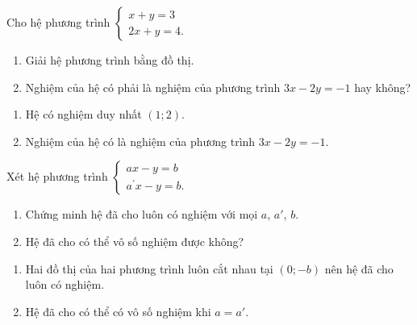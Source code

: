 \begin{bt}%
	Cho hệ phương trình $\begin{cases}
	{x + y = 3}\\
	{2x + y = 4.}
	\end{cases}$
	\begin{enumerate}
	\item Giải hệ phương trình bằng đồ thị.
	\item Nghiệm của hệ có phải là nghiệm của phương trình $3x - 2y = - 1$ hay không?
	\end{enumerate}
	\loigiai
	{
	\begin{enumerate}
	\item Hệ có nghiệm duy nhất $(1;2)$.
	\item Nghiệm của hệ có là nghiệm của phương trình $3x - 2y = - 1$.
	\end{enumerate}	
	}
\end{bt}
\begin{bt}%
	Xét hệ phương trình $\begin{cases}
	{a x - y = b}\\
	{a^{\prime}x - y = b.}
	\end{cases}$
	\begin{enumerate}
	\item Chứng minh hệ đã cho luôn có nghiệm với mọi $a$, $a'$, $b$.
	\item Hệ đã cho có thể vô số nghiệm được không?
	\end{enumerate}
	\loigiai
	{
	\begin{enumerate}
	\item Hai đồ thị của hai phương trình luôn cắt nhau tại $(0;-b)$ nên hệ đã cho luôn có nghiệm.
	\item Hệ đã cho có thể có vô số nghiệm khi $a=a'$.
	\end{enumerate}	
	}
\end{bt}	